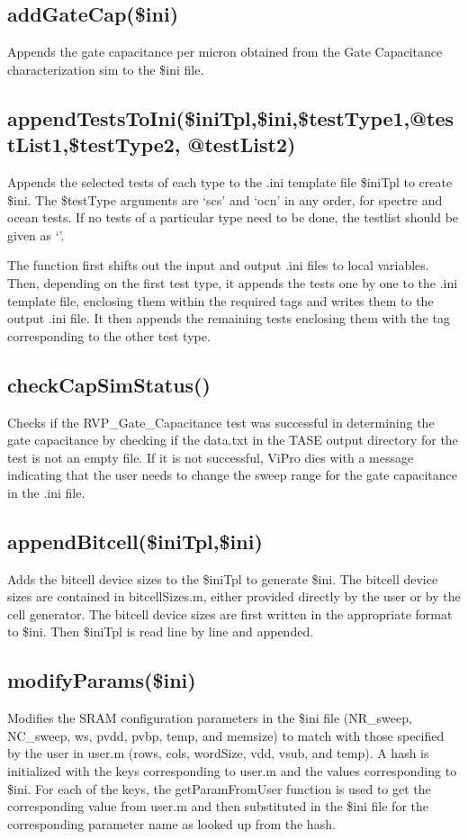 \subsection{ addGateCap(\$ini) }
Appends the gate capacitance per micron obtained from the Gate Capacitance characterization sim to the \$ini file.

\subsection{ appendTestsToIni(\$iniTpl,\$ini,\$testType1,@testList1,\$testType2, @testList2)}
Appends the selected tests of each type to the .ini template file \$iniTpl to create \$ini. The \$testType arguments are `scs' and `ocn' in any order, for spectre and ocean tests. If no tests of a particular type need to be done, the testlist should be given as `'. 

The function first shifts out the input and output .ini files to local variables. Then, depending on the first test type, it appends the tests one by one to the .ini template file, enclosing them within the required tags and writes them to the output .ini file. It then appends the remaining tests enclosing them with the tag corresponding to the other test type.

\subsection{ checkCapSimStatus()}
Checks if the RVP\_Gate\_Capacitance test was successful in determining the gate capacitance by checking if the data.txt in the TASE output directory for the test is not an empty file. If it is not successful, ViPro dies with a message indicating that the user needs to change the sweep range for the gate capacitance in the .ini file.

\subsection{ appendBitcell(\$iniTpl,\$ini)}
Adds the bitcell device sizes to the \$iniTpl to generate \$ini. The bitcell device sizes are contained in bitcellSizes.m, either provided directly by the user or by the cell generator. The bitcell device sizes are first written in the appropriate format to \$ini. Then \$iniTpl is read line by line and appended.

\subsection{ modifyParams(\$ini)}
Modifies the SRAM configuration parameters in the \$ini file (NR\_sweep, NC\_sweep, ws, pvdd, pvbp, temp, and memsize) to match with those specified by the user in user.m (rows, cols, wordSize, vdd, vsub, and temp). A hash is initialized with the keys corresponding to user.m and the values corresponding to \$ini. For each of the keys, the getParamFromUser function is used to get the corresponding value from user.m and then substituted in the \$ini file for the corresponding parameter name as looked up from the hash.

